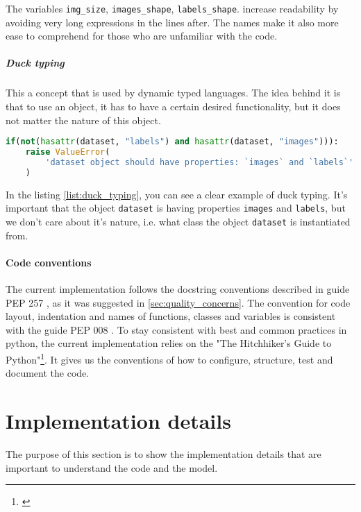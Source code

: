 The variables \lstinline{img_size}, \lstinline{images_shape}, \lstinline{labels_shape}.
increase readability by avoiding very long expressions in the lines after.
The names make it also more ease to comprehend for those who are unfamiliar
with the code.

\subparagraph{Duck typing} This a concept that is used by dynamic typed languages.
The idea behind it is that to use an object, it has to have a certain desired functionality,
but it does not matter the nature of this object.
\begin{lstlisting}[language=Python, caption={Method comment example},label={list:duck_typing}]
if(not(hasattr(dataset, "labels") and hasattr(dataset, "images"))):
	raise ValueError(
		'dataset object should have properties: `images` and `labels`'
	)
\end{lstlisting}

In the listing \ref{list:duck_typing}, you can see a clear example of duck typing.
It's important that the object \lstinline{dataset} is having properties
\lstinline{images} and \lstinline{labels}, but we don't care about it's nature,
i.e. what class the object \lstinline{dataset} is instantiated from.

\paragraph{Code conventions} The current implementation follows the
docstring conventions described in guide PEP 257 \cite{Goodger2001}, as it was
suggested in \autoref{sec:quality_concerns}. The convention for code layout,
indentation and names of functions, classes and variables is consistent with
the guide PEP 008 \cite{Rossum}. To stay consistent with best and common practices
in python, the current implementation relies on the
"The Hitchhiker’s Guide to Python"\footnote{\cite{Reitz}}. It gives us
the conventions of how to configure, structure, test and document the code.

\section{Implementation details}
The purpose of this section is to show the implementation details that
are important to understand the code and the model.

